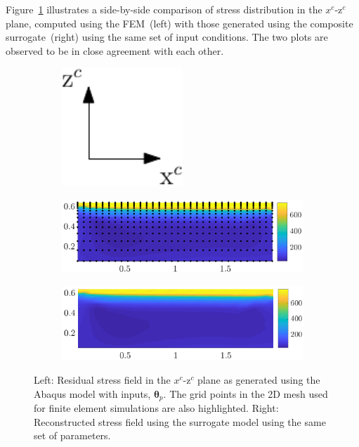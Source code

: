 Figure~\ref{fig:RS_comp} illustrates a side-by-side comparison of stress distribution in the $x^c$-z$^c$ plane,
computed using the FEM~(left) with those generated using the composite surrogate~(right) using the same
set of input conditions. The two plots
are observed to be in close agreement with each other.  
%
\begin{figure}[htbp]
\begin{center}
\begin{subfigure}{0.15\textwidth}
\vspace{10mm}
\includegraphics[width=0.5\textwidth]{./Figures/xczc} 
\end{subfigure}
\hspace{-1.5cm}
\begin{subfigure}{0.35\textwidth}
\includegraphics[width=1.0\textwidth]{./Figures/origZ_sam13} 
\end{subfigure}
\hspace{0.25cm}
\begin{subfigure}{0.35\textwidth}
\includegraphics[width=1.0\textwidth]{./Figures/recZ_sam13} 
\end{subfigure}
\end{center}
\caption{Left: Residual stress field in the $x^c$-z$^c$ plane as generated using the Abaqus model with inputs, 
$\bm{\theta}_p$. The grid points in the 2D mesh used for finite element simulations are also highlighted. 
Right: Reconstructed stress field using the surrogate model using the same set of parameters. }

\label{fig:RS_comp}
\end{figure}

